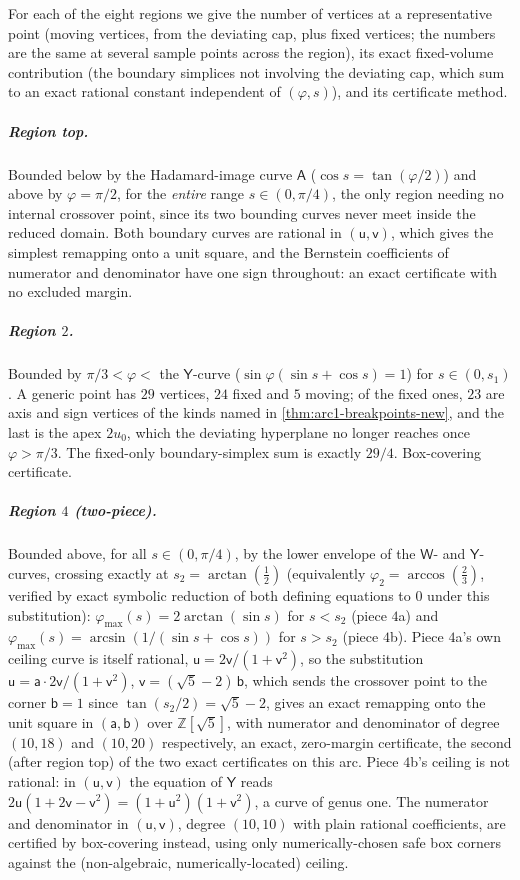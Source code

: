 \documentclass[11pt,reqno]{amsart}
\renewcommand{\_}{\origunderscore\allowbreak}
\numberwithin{equation}{section}
\theoremstyle{plain}
\theoremstyle{definition}
\theoremstyle{remark}
\newcommand{\tilt}{\varphi}                  %
\newcommand{\arcp}{s}                        %
\begin{document}
For each of the eight regions we give the number of vertices at a
representative point (moving vertices, from the deviating cap, plus fixed
vertices; the numbers are the same at several sample points across the
region), its exact fixed-volume contribution (the boundary simplices not
involving the deviating cap, which sum to an exact rational constant
independent of $(\tilt,\arcp)$), and its certificate method.

\subparagraph{Region top.} Bounded below by the
Hadamard-image curve $\mathsf A$ ($\cos\arcp=\tan(\tilt/2)$) and above
by $\tilt=\pi/2$, for the \emph{entire} range $\arcp\in(0,\pi/4)$, the
only region needing no internal crossover point, since its two
bounding curves never meet inside the reduced domain. Both boundary
curves are rational in $(\mathsf u,\mathsf v)$, which gives the simplest
remapping onto a unit square, and the Bernstein coefficients of
numerator and denominator have one sign throughout: an exact certificate
with no excluded margin.

\subparagraph{Region $2$.} Bounded by $\pi/3<\tilt<$ the $\mathsf Y$-curve
($\sin\tilt(\sin\arcp+\cos\arcp)=1$) for $\arcp\in(0,\arcp_1)$. A
generic point has $29$ vertices, $24$ fixed and $5$ moving; of the fixed
ones, $23$ are axis and sign vertices of the kinds named in
\cref{thm:arc1-breakpoints-new}, and the last is the apex $2u_0$, which
the deviating hyperplane no longer reaches once $\tilt>\pi/3$. The fixed-only boundary-simplex sum is exactly
$29/4$. Box-covering certificate.

\subparagraph{Region $4$ (two-piece).}\label{sec:region-4} Bounded above,
for all $\arcp\in(0,\pi/4)$, by the lower envelope of the $\mathsf W$-
and $\mathsf Y$-curves, crossing exactly at
$\arcp_2=\arctan(\tfrac12)$ (equivalently $\tilt_2=\arccos(\tfrac23)$,
verified by exact symbolic reduction of both defining equations to $0$
under this substitution): $\tilt_{\max}(\arcp)=2\arctan(\sin\arcp)$ for
$\arcp<\arcp_2$ (piece $4$a) and
$\tilt_{\max}(\arcp)=\arcsin(1/(\sin\arcp+\cos\arcp))$ for
$\arcp>\arcp_2$ (piece $4$b). Piece $4$a's own ceiling curve is itself
rational, $\mathsf u=2\mathsf v/(1+\mathsf v^2)$, so the substitution
$\mathsf u=\mathsf a\cdot2\mathsf v/(1+\mathsf v^2)$,
$\mathsf v=(\sqrt5-2)\,\mathsf b$, which sends the crossover point to the
corner $\mathsf b=1$ since $\tan(\arcp_2/2)=\sqrt5-2$, gives an exact
remapping onto the unit square in $(\mathsf a,\mathsf b)$ over
$\mathbb{Z}[\sqrt5]$, with numerator and denominator of degree $(10,18)$
and $(10,20)$ respectively, an exact, zero-margin certificate, the
second (after region top) of the two exact certificates on this arc.
Piece $4$b's ceiling is not rational: in $(\mathsf u,\mathsf v)$ the
equation of $\mathsf Y$ reads
$2\mathsf u(1+2\mathsf v-\mathsf v^2)=(1+\mathsf u^2)(1+\mathsf v^2)$, a
curve of genus one. The numerator and denominator in $(\mathsf u,\mathsf v)$,
degree $(10,10)$ with plain rational coefficients, are certified by
box-covering instead, using only numerically-chosen safe box corners
against the (non-algebraic, numerically-located) ceiling.
\end{document}
